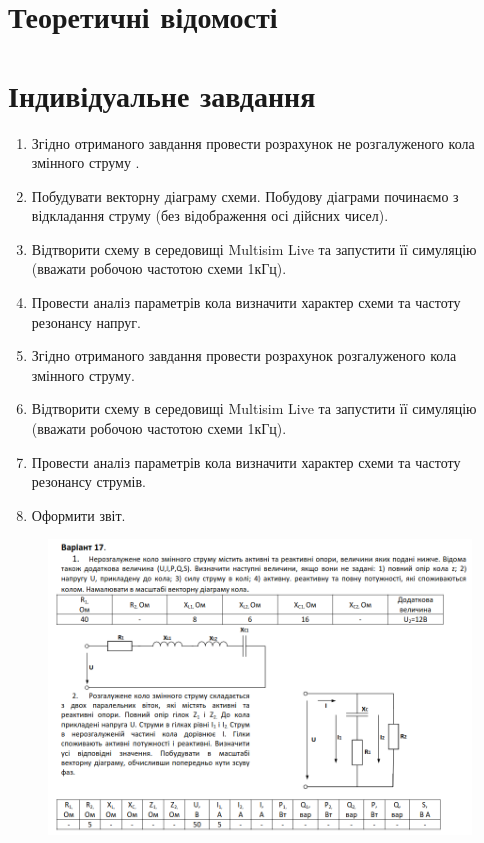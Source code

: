 \documentclass{article}
\begin{document}
\begin{normalsize}
	\section*{Теоретичні відомості}
	
		\section*{Індивідуальне завдання}
	\begin{enumerate}
		\item Згідно отриманого завдання провести розрахунок не розгалуженого кола
		змінного струму .
		\item Побудувати векторну діаграму схеми. Побудову діаграми починаємо з
		відкладання струму (без відображення осі дійсних чисел).
		\item Відтворити схему в середовищі Multisim Live та запустити її симуляцію
		(вважати робочою частотою схеми 1кГц).
		\item Провести аналіз параметрів кола визначити характер схеми та частоту
		резонансу напруг.
		\item Згідно отриманого завдання провести розрахунок розгалуженого кола
		змінного струму.
		\item Відтворити схему в середовищі Multisim Live та запустити її симуляцію
		(вважати робочою частотою схеми 1кГц).
		\item Провести аналіз параметрів кола визначити характер схеми та частоту
		резонансу струмів.
		\item Оформити звіт.
	\end{enumerate}
	
	\begin{figure}[H]
		\centering
		\includegraphics[scale=0.5]{v}
	\end{figure}
	

\end{normalsize}
\end{document}
